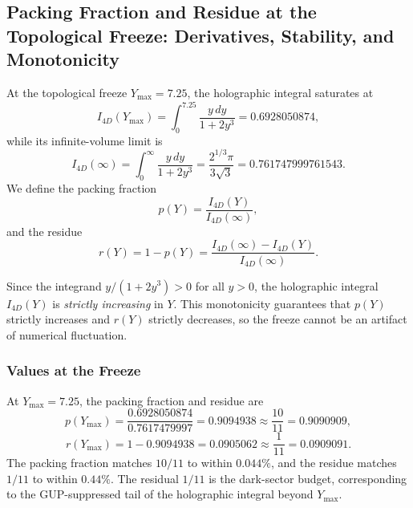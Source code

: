 \documentclass[12pt,oneside,openany]{book}
\begin{document}
\subsection{Packing Fraction and Residue at the Topological Freeze: Derivatives, Stability, and Monotonicity}
\label{sec:packing-residue-derivatives}

At the topological freeze $Y_{\max} = 7.25$, the holographic integral saturates at
\begin{equation}
I_{4D}(Y_{\max}) = \int_0^{7.25} \frac{y\,dy}{1 + 2y^3} = 0.6928050874,
\label{eq:I4D-freeze}
\end{equation}
while its infinite-volume limit is
\begin{equation}
I_{4D}(\infty) = \int_0^{\infty} \frac{y\,dy}{1 + 2y^3} = \frac{2^{1/3}\pi}{3\sqrt{3}} = 0.761747999761543.
\label{eq:I4D-infinity}
\end{equation}
We define the packing fraction
\begin{equation}
p(Y) = \frac{I_{4D}(Y)}{I_{4D}(\infty)},
\label{eq:packing-fraction-def}
\end{equation}
and the residue
\begin{equation}
r(Y) = 1 - p(Y) = \frac{I_{4D}(\infty) - I_{4D}(Y)}{I_{4D}(\infty)}.
\label{eq:residue-def}
\end{equation}

Since the integrand $y/(1+2y^3) > 0$ for all $y > 0$, the holographic integral $I_{4D}(Y)$ is \emph{strictly increasing} in $Y$. This monotonicity guarantees that $p(Y)$ strictly increases and $r(Y)$ strictly decreases, so the freeze cannot be an artifact of numerical fluctuation.

\subsubsection{Values at the Freeze}

At $Y_{\max} = 7.25$, the packing fraction and residue are
\begin{equation}
\boxed{p(Y_{\max}) = \frac{0.6928050874}{0.7617479997} = 0.9094938 \approx \frac{10}{11} = 0.9090909,}
\label{eq:p-freeze}
\end{equation}
\begin{equation}
\boxed{r(Y_{\max}) = 1 - 0.9094938 = 0.0905062 \approx \frac{1}{11} = 0.0909091.}
\label{eq:r-freeze}
\end{equation}
The packing fraction matches $10/11$ to within $0.044\%$, and the residue matches $1/11$ to within $0.44\%$. The residual $1/11$ is the dark-sector budget, corresponding to the GUP-suppressed tail of the holographic integral beyond $Y_{\max}$.
\end{document}
